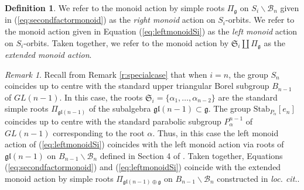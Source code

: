 \documentclass[12pt]{amsart}
\numberwithin{equation}{section}
\theoremstyle{remark}
\newtheorem{rem}[thm]{Remark}
\theoremstyle{definition}
\newtheorem{dfn}[thm]{Definition}
\newcommand{\fg}{\mbox{${\mathfrak g}$}}
\newcommand{\fgl}{\mathfrak{gl}}
\newcommand{\B}{\mathcal{B}}
\newcommand{\Borbitspace}{B_{n-1}\backslash\B_{n}}
\begin{document}
\begin{dfn}\label{d:leftandright}
We refer to the monoid action by simple roots $\Pi_{\fg}$ on $S_{i}\backslash\B_{n}$ given in (\ref{eq:secondfactormonoid}) as the \emph{right monoid} action on $S_{i}$-orbits.  We refer to the monoid action given in Equation (\ref{eq:leftmonoidSi}) as the \emph{left monoid} action on $S_{i}$-orbits. Taken together, we refer to the monoid action by $\mathfrak{S}_i\coprod \Pi_{\fg}$ as the \emph{extended monoid action}.  
\end{dfn}

\begin{rem}\label{r:extended}
Recall from Remark \ref{r:specialcase} that when $i=n$, the group $S_{n}$ coincides up to centre with the standard upper triangular Borel subgroup $B_{n-1}$ of $GL(n-1)$.  In this case,
the roots $\mathfrak{S}_i=\{\alpha_{1},\dots,\alpha_{n-2}\}$ are the standard simple roots $\Pi_{\fgl(n-1)}$ of the subalgebra $\fgl(n-1)\subset\fg$.  The group $\mbox{Stab}_{P_{\alpha}}[e_{n}]$ coincides up to centre with the standard parabolic subgroup $P^{n-1}_{\alpha}$ of $GL(n-1)$ corresponding to the root $\alpha$.  Thus, in this case the left monoid action of (\ref{eq:leftmonoidSi}) coincides with the left monoid action via roots of $\fgl(n-1)$ on $\Borbitspace$ defined in Section 4 of \cite{CE21I}.  Taken together, Equations (\ref{eq:secondfactormonoid}) and (\ref{eq:leftmonoidSi}) coincide with the extended monoid action by simple roots $\Pi_{\fgl(n-1)\oplus\fg}$ on $\Borbitspace$ constructed in \emph{loc. cit.}.
\end{rem}
\end{document}
